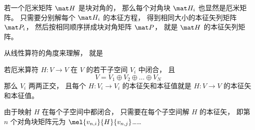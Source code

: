 

\begin{theorem}{}
若一个厄米矩阵 $\mat H$ 是块对角的， 那么每个对角块 $\mat H_i$ 也显然是厄米矩阵。 只需要分别解每个 $\mat H_i$ 的本征方程， 得到相同大小的本征矢列矩阵 $\mat P_i$， 然后按相同顺序拼成块对角矩阵 $\mat P$， 就是 $\mat H$ 的本征矢列矩阵。
\end{theorem}

从线性算符的角度来理解， 就是
\begin{theorem}{}
若厄米算符 $H:V\to V$ 在 $V$ 的若干子空间 $V_i$ 中闭合， 且
\begin{equation}
V = V_1\oplus V_2\oplus \dots \oplus V_N
\end{equation}
那么 $V_i$ 两两正交， 且每个 $H:V_i\to V_i$ 的本征矢和本征值就是 $H:V\to V$ 的本征矢和本征值。
\end{theorem}


由于映射 $H$ 在每个子空间中都闭合， 只需要在每个子空间解 $H$ 的本征矢， 即第 $n$ 个对角块矩阵元为 $\mel{v_{n,i}}{H}{v_{n,j}}$……
